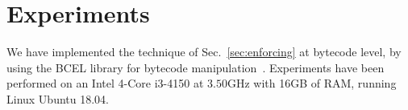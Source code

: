 \section{Experiments}\label{sec:experiments}

We have implemented the technique of Sec.~\ref{sec:enforcing}
at bytecode level, by using the BCEL
library for bytecode manipulation~\cite{bcel}.
Experiments have been performed on
an Intel 4-Core i3-4150 at $3.50$GHz with 16GB of RAM, running Linux Ubuntu 18.04.
%
